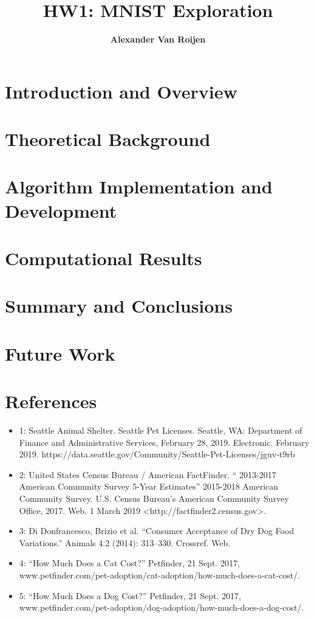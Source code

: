 \documentclass[12pt]{article}
\begin{document}
	
	\title{%
		HW1: MNIST Exploration}
	\author{\bf Alexander Van Roijen}
	
	\maketitle
	\section{Introduction and Overview}
	
	\section{Theoretical Background}
	
	\section{Algorithm Implementation and Development}

	
	\section[Look what i made]{Computational Results}

	\section[see]{Summary and Conclusions}

	\section{Future Work}

	\section{References}
	\begin{itemize}
		\item 1: Seattle Animal Shelter. Seattle Pet Licenses. Seattle, WA: Department of Finance and Administrative Services, February 28, 2019. Electronic. February 2019. https://data.seattle.gov/Community/Seattle-Pet-Licenses/jguv-t9rb
		\item 2: United States Census Bureau / American FactFinder. “ 2013-2017 American Community Survey 5-Year Estimates” 2015-2018 American Community Survey. U.S. Census Bureau’s American Community Survey Office, 2017. Web. 1 March 2019 <http://factfinder2.census.gov>.
		\item 3: Di Donfrancesco, Brizio et al. “Consumer Acceptance of Dry Dog Food Variations.” Animals 4.2 (2014): 313–330. Crossref. Web.
		\item 4: “How Much Does a Cat Cost?” Petfinder, 21 Sept. 2017, www.petfinder.com/pet-adoption/cat-adoption/how-much-does-a-cat-cost/.
		\item 5:
		“How Much Does a Dog Cost?” Petfinder, 21 Sept. 2017, www.petfinder.com/pet-adoption/dog-adoption/how-much-does-a-dog-cost/.
		
	\end{itemize}
\end{document}
